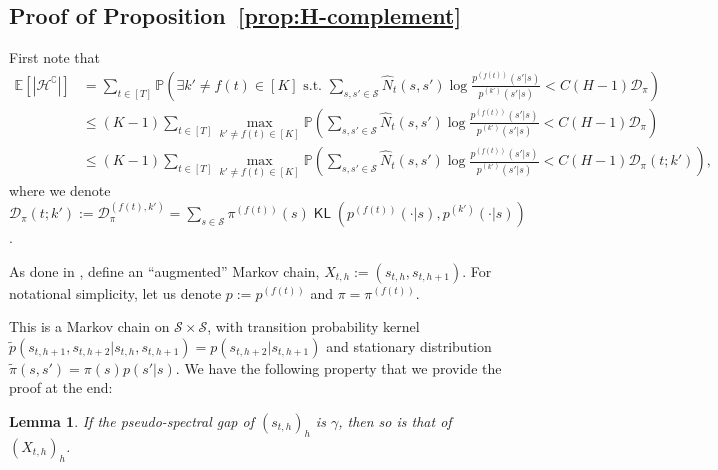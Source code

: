 \documentclass[twoside]{article}
\DeclareMathOperator{\KL}{{\mathsf{KL}}}
\def\gD{{\mathcal{D}}}
\def\gH{{\mathcal{H}}}
\def\gS{{\mathcal{S}}}
\def\sP{{\mathbb{P}}}
\newcommand{\E}{\mathbb{E}}
\theoremstyle{plain}
\newtheorem{lemma}{Lemma}[section]
\begin{document}
\subsection{Proof of Proposition~\ref{prop:H-complement}}
First note that
\begin{align*}
    \E[|\gH^\complement|] &= \sum_{t \in [T]} \sP\left( \exists k' \neq f(t) \in [K] \text{ s.t. } \sum_{s, s' \in \gS} \widehat{N}_t(s, s') \log \frac{p^{(f(t))}(s' | s)}{p^{(k')}(s' | s)} < C (H - 1) \gD_\pi \right) \\
    &\leq (K - 1) \sum_{t \in [T]} \max_{k' \neq f(t) \in [K]} \sP\left( \sum_{s, s' \in \gS} \widehat{N}_t(s, s') \log \frac{p^{(f(t))}(s' | s)}{p^{(k')}(s' | s)} < C (H - 1) \gD_\pi \right) \\
    &\leq (K - 1) \sum_{t \in [T]} \max_{k' \neq f(t) \in [K]} \sP\left( \sum_{s, s' \in \gS} \widehat{N}_t(s, s') \log \frac{p^{(f(t))}(s' | s)}{p^{(k')}(s' | s)} < C (H - 1) \gD_\pi(t; k') \right),
\end{align*}
where we denote $\gD_\pi(t; k') := \gD_\pi^{(f(t),k')} = \sum_{s \in \gS} \pi^{(f(t))}(s) \KL(p^{(f(t))}(\cdot | s), p^{(k')}(\cdot | s))$.


As done in \citet{sanders2020bmc,jedra2023bmdp}, define an ``augmented'' Markov chain, $X_{t,h} := (s_{t,h}, s_{t,h+1})$.
For notational simplicity, let us denote $p := p^{(f(t))}$ and $\pi = \pi^{(f(t))}$.
    
This is a Markov chain on $\gS \times \gS$, with transition probability kernel $\tilde{p}(s_{t,h+1}, s_{t,h+2} | s_{t,h}, s_{t,h+1}) = p(s_{t,h+2} | s_{t,h+1})$ and stationary distribution $\tilde{\pi}(s, s') = \pi(s) p(s' | s)$.
We have the following property that we provide the proof at the end:
\begin{lemma}
\label{lem:pseudo-spectral-X}
    If the pseudo-spectral gap of $(s_{t,h})_h$ is $\gamma$, then so is that of $(X_{t,h})_h$.
\end{lemma}
\end{document}
